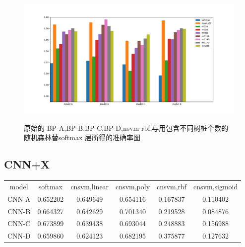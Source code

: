 \begin{figure}[htb]
\centering
\includegraphics[scale=0.5]{../figures/NN_rf1.png} \\
\caption{原始的 BP-A,BP-B,BP-C,BP-D,nsvm-rbf,与用包含不同树桩个数的随机森林替softmax 层所得的准确率图}
\label{fig:bpx3}
\end{figure}


\subsection{CNN+X}
\begin{table}[htb]
\centering
\begin{tabular}{cccccc}
\toprule[2pt]
model & softmax & cnsvm,linear & cnsvm,poly & cnsvm,rbf & cnsvm,sigmoid \\ 
CNN-A & 0.652202 & 0.649649 & 0.654116 & 0.167837 & 0.110402\\ 
CNN-B & 0.664327 & 0.642629 & 0.701340 & 0.219528 & 0.084876\\ 
CNN-C & 0.673899 & 0.639438 & 0.693044 & 0.248883 & 0.156988\\ 
CNN-D & 0.659860 & 0.624123 & 0.682195 & 0.375877 & 0.127632\\ 
\bottomrule[2pt]
\end{tabular} 
\label{table:cnnx1}
\end{table}


